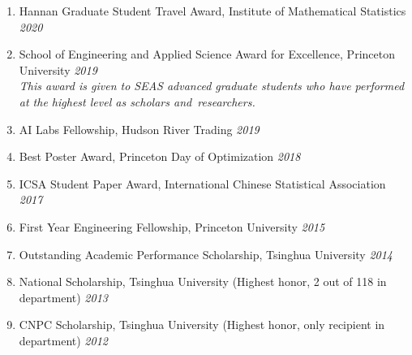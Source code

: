 \documentclass[a4paper, 10pt]{article}
\newenvironment{changemargin}[2]{%
  \begin{list}{}{%
    \setlength{\topsep}{0pt}%
    \setlength{\leftmargin}{#1}%
    \setlength{\rightmargin}{#2}%
    \setlength{\listparindent}{\parindent}%
    \setlength{\itemindent}{\parindent}%
    \setlength{\parsep}{\parskip}%
  }%
  \item[]}{\end{list}
}
\newenvironment{body} {
	\vspace*{-16pt}
	\begin{changemargin}{-0.3in}{-0.5in}
  }	
	{\end{changemargin}
}
\begin{document}
\begin{body}
\begin{enumerate}
    \item  Hannan Graduate Student Travel Award, Institute of Mathematical Statistics \hfill{} \emph{2020} \\
    \item {School of Engineering and Applied Science Award for Excellence}, Princeton University \hfill{} \emph{2019}\\
    {\em This award is given to SEAS advanced graduate students who have performed at the highest level as scholars and~researchers.} \\
    \smallskip
    \item {AI Labs Fellowship}, Hudson River Trading  \hfill{} \emph{2019}\\
    \smallskip
   \item {Best Poster Award}, Princeton Day of Optimization  \hfill{} \emph{2018}\\
     \smallskip
     \item {ICSA Student Paper Award}, International Chinese Statistical Association  \hfill{} \emph{2017}\\
     \smallskip
     \item  {First Year Engineering Fellowship}, Princeton University \hfill{} \emph{2015}\\
    \smallskip
    \item {Outstanding Academic Performance Scholarship}, Tsinghua University  \hfill{} \emph{2014}\\
    \smallskip
    \item {National Scholarship}, Tsinghua University (Highest honor, 2 out of 118 in department)\hfill{} \emph{2013}\\
    \smallskip
    \item {CNPC Scholarship}, Tsinghua University (Highest honor, only recipient in  department)\hfill{} \emph{2012}
    \end{enumerate}
\end{body}
\end{document}
